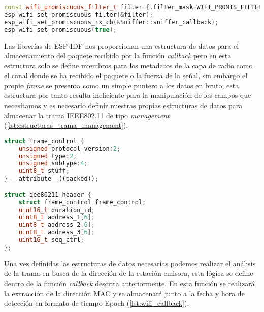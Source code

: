 \documentclass[../proyecto.tex]{subfiles}
\begin{document}
\begin{minipage}{\linewidth}
\begin{lstlisting}[language=C++, caption=Activación del modo promiscuo con filtrado, captionpos=b, frame=single]
const wifi_promiscuous_filter_t filter={.filter_mask=WIFI_PROMIS_FILTER_MASK_MGMT};
esp_wifi_set_promiscuous_filter(&filter);
esp_wifi_set_promiscuous_rx_cb(&Sniffer::sniffer_callback);
esp_wifi_set_promiscuous(true);
\end{lstlisting}
\end{minipage}

Las librerías de ESP-IDF nos proporcionan una estructura de datos para el almacenamiento del paquete recibido por la función \textit{callback} pero en esta estructura solo se define miembros para los metadatos de la capa de radio como el canal donde se ha recibido el paquete o la fuerza de la señal, sin embargo el propio \textit{frame} se presenta como un simple puntero a los datos en bruto, esta estructura por tanto resulta ineficiente para la manipulación de los campos que necesitamos y es necesario definir nuestras propias estructuras de datos para almacenar la trama IEEE802.11 de tipo \textit{management} (\autoref{lst:estructuras_trama_management}).\\

\begin{lstlisting}[language=C++, caption=Estructuras de datos para almacenamiento de las cabeceras IEEE802.11 , captionpos=b, frame=single, label={lst:estructuras_trama_management}]
struct frame_control {
    unsigned protocol_version:2;
    unsigned type:2;
    unsigned subtype:4;
    uint8_t stuff;
} __attribute__((packed));

struct iee80211_header {
    struct frame_control frame_control;
    uint16_t duration_id;
    uint8_t address_1[6];
    uint8_t address_2[6];
    uint8_t address_3[6];
    uint16_t seq_ctrl;
};
\end{lstlisting}

Una vez definidas las estructuras de datos necesarias podemos realizar el análisis de la trama en busca de la dirección de la estación emisora, esta lógica se define dentro de la función \textit{callback} descrita anteriormente. En esta función se realizará la extracción de la dirección MAC y se almacenará junto a la fecha y hora de detección en formato de tiempo Epoch (\autoref{lst:wifi_callback}).\\
\end{document}
